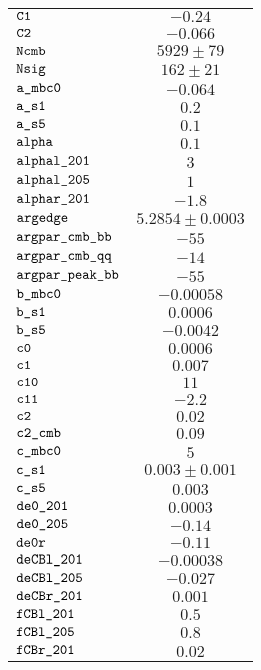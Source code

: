 \begin{tabular}{lc}
$\verb+C1+ $ & $ -0.24$\\
$\verb+C2+ $ & $ -0.066$\\
$\verb+Ncmb+ $ & $  5929\pm 79$\\
$\verb+Nsig+ $ & $  162\pm 21$\\
$\verb+a_mbc0+ $ & $ -0.064$\\
$\verb+a_s1+ $ & $  0.2$\\
$\verb+a_s5+ $ & $  0.1$\\
$\verb+alpha+ $ & $  0.1$\\
$\verb+alphal_201+ $ & $  3$\\
$\verb+alphal_205+ $ & $  1$\\
$\verb+alphar_201+ $ & $ -1.8$\\
$\verb+argedge+ $ & $  5.2854\pm 0.0003$\\
$\verb+argpar_cmb_bb+ $ & $ -55$\\
$\verb+argpar_cmb_qq+ $ & $ -14$\\
$\verb+argpar_peak_bb+ $ & $ -55$\\
$\verb+b_mbc0+ $ & $ -0.00058$\\
$\verb+b_s1+ $ & $  0.0006$\\
$\verb+b_s5+ $ & $ -0.0042$\\
$\verb+c0+ $ & $  0.0006$\\
$\verb+c1+ $ & $  0.007$\\
$\verb+c10+ $ & $  11$\\
$\verb+c11+ $ & $ -2.2$\\
$\verb+c2+ $ & $  0.02$\\
$\verb+c2_cmb+ $ & $  0.09$\\
$\verb+c_mbc0+ $ & $  5$\\
$\verb+c_s1+ $ & $  0.003\pm 0.001$\\
$\verb+c_s5+ $ & $  0.003$\\
$\verb+de0_201+ $ & $  0.0003$\\
$\verb+de0_205+ $ & $ -0.14$\\
$\verb+de0r+ $ & $ -0.11$\\
$\verb+deCBl_201+ $ & $ -0.00038$\\
$\verb+deCBl_205+ $ & $ -0.027$\\
$\verb+deCBr_201+ $ & $  0.001$\\
$\verb+fCBl_201+ $ & $  0.5$\\
$\verb+fCBl_205+ $ & $  0.8$\\
$\verb+fCBr_201+ $ & $  0.02$\\

\end{tabular}
